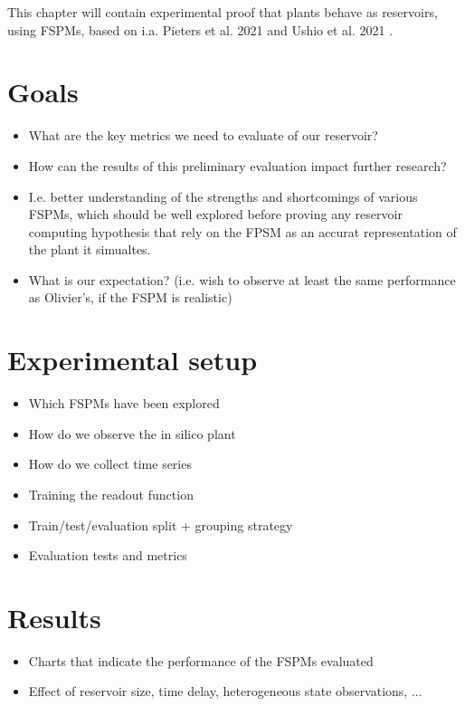 This chapter will contain experimental proof that plants behave as reservoirs, using FSPMs, based on i.a. Pieters et al. 2021 \supercite{pieters_plants_2021} and Ushio et al. 2021 \supercite{ushio_computational_2021}.

\section{Goals}

\begin{itemize}
\item What are the key metrics we need to evaluate of our reservoir?
\item How can the results of this preliminary evaluation impact further research?
\item I.e. better understanding of the strengths and shortcomings of various FSPMs, which should be well explored before proving any reservoir computing hypothesis that rely on the FPSM as an accurat representation of the plant it simualtes.
\item What is our expectation? (i.e. wish to observe at least the same performance as Olivier’s, if the FSPM is realistic)
\end{itemize}


\section{Experimental setup}

\begin{itemize}
\item Which FSPMs have been explored
\item How do we observe the in silico plant
\item How do we collect time series
\item Training the readout function
\item Train/test/evaluation split + grouping strategy
\item Evaluation tests and metrics
\end{itemize}

\section{Results}


\begin{itemize}
\item Charts that indicate the performance of the FSPMs evaluated
\item Effect of reservoir size, time delay, heterogeneous state observations, ...
\end{itemize}


